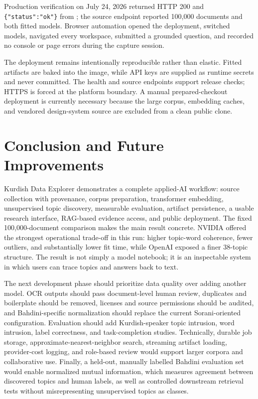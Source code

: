 \documentclass[11pt,a4paper]{article}
\newcommand{\sourcecode}[1]{\texttt{\detokenize{#1}}}
\begin{document}
Production verification on July 24, 2026 returned HTTP 200 and
\texttt{\{"status":"ok"\}} from \sourcecode{/api/health}; the source endpoint
reported 100,000 documents and both fitted models. Browser automation opened
the deployment, switched models, navigated every workspace, submitted a
grounded question, and recorded no console or page errors during the capture
session.

The deployment remains intentionally reproducible rather than elastic. Fitted
artifacts are baked into the image, while API keys are supplied as runtime
secrets and never committed. The health and source endpoints support release
checks; HTTPS is forced at the platform boundary. A manual prepared-checkout
deployment is currently necessary because the large corpus, embedding caches,
and vendored design-system source are excluded from a clean public clone.

\section{Conclusion and Future Improvements}

Kurdish Data Explorer demonstrates a complete applied-AI workflow: source
collection with provenance, corpus preparation, transformer embedding,
unsupervised topic discovery, measurable evaluation, artifact persistence, a
usable research interface, RAG-based evidence access, and public deployment.
The fixed 100,000-document comparison makes the main result concrete. NVIDIA
offered the strongest operational trade-off in this run: higher topic-word
coherence, fewer outliers, and substantially lower fit time, while OpenAI
exposed a finer 38-topic structure. The result is not simply a model notebook;
it is an inspectable system in which users can trace topics and answers back to
text.

The next development phase should prioritize data quality over adding another
model. OCR outputs should pass document-level human review, duplicates and
boilerplate should be removed, licenses and source permissions should be
audited, and Bahdini-specific normalization should replace the current
Sorani-oriented configuration. Evaluation should add Kurdish-speaker topic
intrusion, word intrusion, label correctness, and task-completion studies.
Technically, durable job storage, approximate-nearest-neighbor search, streaming
artifact loading, provider-cost logging, and role-based review would support
larger corpora and collaborative use. Finally, a held-out, manually labelled
Bahdini evaluation set would enable normalized mutual information, which
measures agreement between discovered topics and human labels, as well as
controlled downstream retrieval tests without misrepresenting unsupervised
topics as classes.
\end{document}
